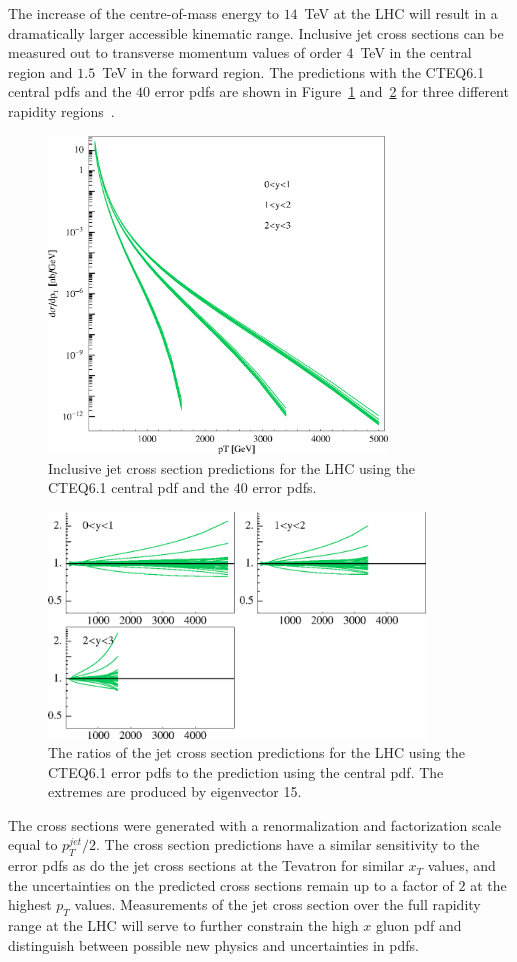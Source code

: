 \documentclass[12pt]{iopart}
\begin{document}
The increase of the centre-of-mass energy to $14$~TeV at the LHC will result in a  dramatically larger accessible
kinematic range. Inclusive jet cross sections can be measured out to transverse momentum values of order
$4$~TeV in the central region and $1.5$~TeV in  the forward region. The predictions with the CTEQ6.1 central
pdfs and the $40$ error pdfs are shown in Figure~\ref{fig:lhc_jet} and~\ref{fig:lhc_ratios} for three
different rapidity regions~\cite{Stump:2003yu}.
%
\begin{figure}[t]
\begin{center}
\includegraphics[width=9cm]{LHCcrosssection.eps}
\end{center}
\caption{
Inclusive jet cross section predictions for the LHC using the 
CTEQ6.1 central pdf and the $40$ error pdfs.} 
\label{fig:lhc_jet}
\end{figure}
%
%
\begin{figure}[t]
\begin{center}
\includegraphics[width=10cm,angle=0]{LHCratios.eps}
\end{center}
\caption{
The ratios of the jet cross section predictions for the LHC using the 
CTEQ6.1 error pdfs to the prediction using the central pdf. The extremes are produced by eigenvector 15.} 
\label{fig:lhc_ratios}
\end{figure}
%
The cross sections were generated with a renormalization and
factorization scale equal to $p_T^{jet}/2$. The cross section predictions have a similar sensitivity  to the
error pdfs as do the jet cross sections at the Tevatron for similar $x_T$ values, and  the uncertainties on the
predicted cross sections remain up to a factor of $2$ at the highest $p_T$ values. Measurements of the jet cross
section over the full rapidity range at the LHC  will serve to further constrain the high $x$ gluon pdf and
distinguish between possible new  physics and uncertainties in pdfs. 
\end{document}
